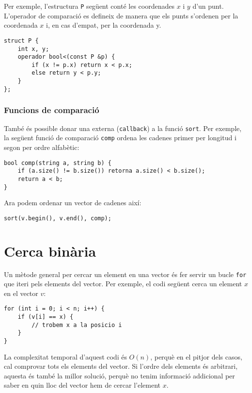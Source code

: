 Per exemple, l'estructura \texttt{P} següent
conté les coordenades $x$ i $y$ d'un punt.
L'operador de comparació es defineix de manera que
els punts s'ordenen per la coordenada $x$
i, en cas d'empat, per la coordenada y.

\begin{lstlisting}
struct P {
    int x, y;
    operador bool<(const P &p) {
        if (x != p.x) return x < p.x;
        else return y < p.y;
    }
};
\end{lstlisting}

\subsubsection{Funcions de comparació}


També és possible donar una
 externa (\texttt{callback}) a la funció
\texttt{sort}. 
Per exemple, la següent funció de comparació \texttt{comp}
ordena les cadenes primer per longitud i segon per ordre alfabètic:

\begin{lstlisting}
bool comp(string a, string b) {
    if (a.size() != b.size()) retorna a.size() < b.size();
    return a < b;
}
\end{lstlisting}
Ara podem ordenar un vector de cadenes així:
\begin{lstlisting}
sort(v.begin(), v.end(), comp);
\end{lstlisting}

\section{Cerca binària}


Un mètode general per cercar un element
en una vector és fer servir un bucle \texttt{for}
que iteri pels elements del vector.
Per exemple, el codi següent cerca
un element $x$ en el vector $v$:

\begin{lstlisting}
for (int i = 0; i < n; i++) {
    if (v[i] == x) {
        // trobem x a la posicio i
    }
}
\end{lstlisting}

La complexitat temporal d'aquest codi és $O(n)$,
perquè en el pitjor dels casos, cal comprovar
tots els elements del vector.
Si l'ordre dels elements és arbitrari,
aquesta és també la millor solució, perquè
no tenim informació addicional per saber en quin
lloc del vector hem de cercar l'element $x$.

